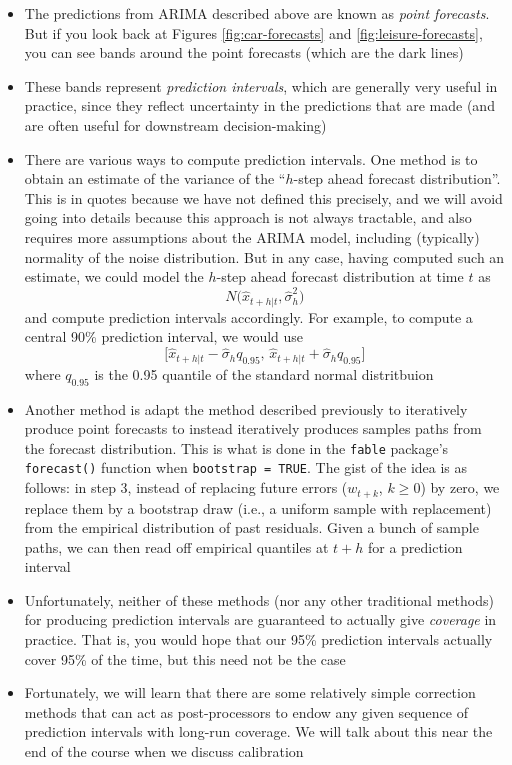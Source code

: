 \documentclass{article}
\begin{document}
\begin{itemize}
\item The predictions  from ARIMA described above are 
    known as \emph{point forecasts}. But if you look back at Figures
    \ref{fig:car-forecasts} and \ref{fig:leisure-forecasts}, you can see bands
    around the point forecasts (which are the dark lines) 

\item These bands represent \emph{prediction intervals}, which are generally
  very useful in practice, since they reflect uncertainty in the predictions
  that are made (and are often useful for downstream decision-making) 

\item There are various ways to compute prediction intervals. One method is to
  obtain an estimate  of the variance of the ``$h$-step
  ahead forecast distribution''. This is in quotes because we have not defined
  this precisely, and we will avoid going into details because this approach is
  not always tractable, and also requires more assumptions about the ARIMA
  model, including (typically) normality of the noise distribution. But in any
  case, having computed such an estimate, we could model the $h$-step ahead
  forecast distribution at time $t$ as
  \[
  N\big( \hat{x}_{t+h | t}, \hat\sigma^2_h \big)
  \]
  and compute prediction intervals accordingly. For example, to compute a
  central 90\% prediction interval, we would use 
  \[
  \big[\hat{x}_{t+h | t} - \hat\sigma_h q_{0.95}, \, \hat{x}_{t+h | t} +  
  \hat\sigma_h q_{0.95} \big]
  \]
  where $q_{0.95}$ is the 0.95 quantile of the standard normal distritbuion

\item Another method is adapt the method described previously to iteratively
  produce point forecasts to instead iteratively produces samples paths from the
  forecast distribution. This is what is done in the \verb|fable| package's
  \verb|forecast()| function when \verb|bootstrap = TRUE|. The gist of the idea
  is as follows: in step 3, instead of replacing future errors ($w_{t+k}$, $k
  \geq 0$) by zero, we replace them by a bootstrap draw (i.e., a uniform sample
  with replacement) from the empirical distribution of past residuals. Given a
  bunch of sample paths, we can then read off empirical quantiles at $t+h$ for a
  prediction interval  

\item Unfortunately, neither of these methods (nor any other traditional
  methods) for producing prediction intervals are guaranteed to actually give
  \emph{coverage} in practice. That is, you would hope that our 95\% prediction 
  intervals actually cover 95\% of the time, but this need not be the case

\item Fortunately, we will learn that there are some relatively simple
  correction methods that can act as post-processors to endow any given sequence
  of prediction intervals with long-run coverage. We will talk about this near the 
  end of the course when we discuss calibration  
\end{itemize}
\end{document}
